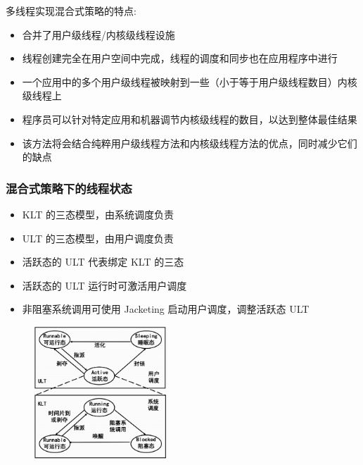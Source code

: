 \documentclass[cs4size,a4paper,10pt]{ctexart}
\begin{document}
	多线程实现混合式策略的特点:
	\begin{itemize}
		\item 合并了用户级线程/内核级线程设施
		\item 线程创建完全在用户空间中完成，线程的调度和同步也在应用程序中进行
		\item 一个应用中的多个用户级线程被映射到一些（小于等于用户级线程数目）内核级线程上
		\item 程序员可以针对特定应用和机器调节内核级线程的数目，以达到整体最佳结果
		\item 该方法将会结合纯粹用户级线程方法和内核级线程方法的优点，同时减少它们的缺点
	\end{itemize}

	\subsubsection{混合式策略下的线程状态}
	\begin{itemize}
		\item KLT 的三态模型，由系统调度负责
		\item ULT 的三态模型，由用户调度负责
		\item 活跃态的 ULT 代表绑定 KLT 的三态
		\item 活跃态的 ULT 运行时可激活用户调度
		\item 非阻塞系统调用可使用 Jacketing 启动用户调度，调整活跃态 ULT
	\end{itemize}
	\begin{figure}[H]
		\centering
		\includegraphics[width=0.45\textwidth]{img/2.4.3.2}
	\end{figure}
\end{document}
